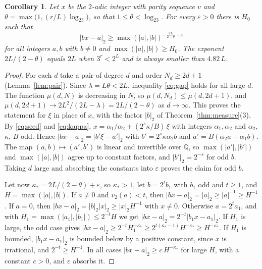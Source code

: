 \documentclass[11pt,reqno]{amsart}
\newtheorem{corollary}[theorem]{Corollary}
\theoremstyle{definition}
\theoremstyle{remark}
\newcommand{\Q}{\mathbb{Q}}
\newcommand{\vt}{v_2}
\begin{document}
\begin{corollary}\label{cor:exponent}
Let $x$ be the $2$-adic integer with parity sequence $v$ and
$\theta=\max\bigl(1,(r/L)\log_23\bigr)$, so that $1\le\theta<\log_23$.  For
every $\varepsilon>0$ there is $H_0$ such that
\[
  |bx-a|_2\ge\max(|a|,|b|)^{-\frac{2L}{2-\theta}-\varepsilon}
\]
for all integers $a,b$ with $b\ne 0$ and $\max(|a|,|b|)\ge H_0$.  The
exponent $2L/(2-\theta)$ equals $2L$ when $3^{r}<2^{L}$ and is always
smaller than $4.82\,L$.
\end{corollary}

\begin{proof}
For each $d$ take a pair of degree $d$ and order $N_d\ge 2d+1$
(Lemma~\ref{lem:pair}).  Since $\lambda=L\theta<2L$, inequality
\eqref{eq:gap} holds for all large $d$.  The function $\mu(d,N)$ is
decreasing in $N$, so $\mu(d,N_d)\le\mu(d,2d+1)$, and
$\mu(d,2d+1)\to 2L^{2}/(2L-\lambda)=2L/(2-\theta)$ as $d\to\infty$.  This
proves the statement for $\xi$ in place of $x$, with the factor $|b|_2$ of
Theorem~\ref{thm:measure}(3).  By \eqref{eq:seed} and \eqref{eq:kappa},
$x=\alpha_1/\alpha_2+(2^{s}\kappa/B)\,\xi$ with integers $\alpha_1,\alpha_2$
and $\alpha_2$, $\kappa$, $B$ odd.  Hence
$|bx-a|_2=|b'\xi-a'|_2$ with $b'=2^{s}\kappa\alpha_2b$ and
$a'=B(\alpha_2a-\alpha_1b)$.  The map $(a,b)\mapsto(a',b')$ is linear and
invertible over $\Q$, so $\max(|a'|,|b'|)$ and $\max(|a|,|b|)$ agree up to
constant factors, and $|b'|_2=2^{-s}$ for odd $b$.  Taking $d$ large and
absorbing the constants into $\varepsilon$ proves the claim for odd $b$.

Let now $\kappa_*=2L/(2-\theta)+\varepsilon$, so $\kappa_*>1$, let
$b=2^{t}b_1$ with $b_1$ odd and $t\ge 1$, and $H=\max(|a|,|b|)$.  If
$a\ne 0$ and $\vt(a)<t$, then $|bx-a|_2=|a|_2\ge|a|^{-1}\ge H^{-1}$.  If
$a=0$, then $|bx-a|_2=|b|_2|x|_2\ge|x|_2H^{-1}$ with $x\ne 0$.  Otherwise
$a=2^{t}a_1$, and with $H_1=\max(|a_1|,|b_1|)\le 2^{-t}H$ we get
$|bx-a|_2=2^{-t}|b_1x-a_1|_2$.  If $H_1$ is large, the odd case gives
$|bx-a|_2\ge 2^{-t}H_1^{-\kappa_*}\ge 2^{t(\kappa_*-1)}H^{-\kappa_*}\ge
H^{-\kappa_*}$.  If $H_1$ is bounded, $|b_1x-a_1|_2$ is bounded below by a
positive constant, since $x$ is irrational, and $2^{-t}\ge H^{-1}$.  In all
cases $|bx-a|_2\ge c\,H^{-\kappa_*}$ for large $H$, with a constant $c>0$,
and $\varepsilon$ absorbs it.
\end{proof}
\end{document}
